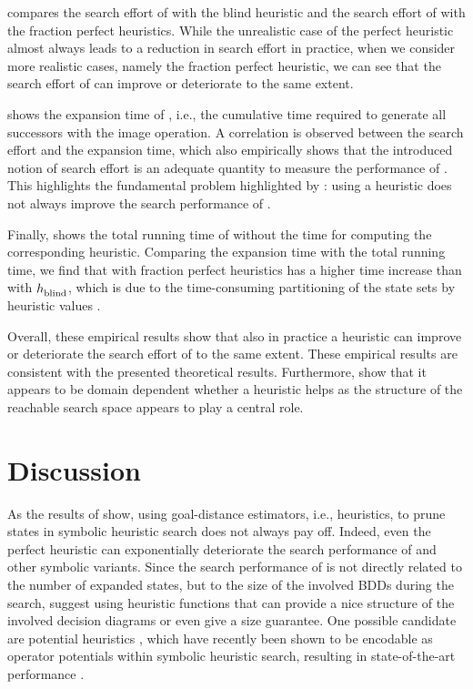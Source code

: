  compares the search effort of \bddastar{} with the blind heuristic and the search effort of \bddastar{} with the fraction perfect heuristics.
While the unrealistic case of the perfect heuristic almost always leads to a reduction in search effort in practice, when we consider more realistic cases, namely the fraction perfect heuristic, we can see that the search effort of \bddastar{} can improve or deteriorate to the same extent.

 shows the expansion time of \bddastar{}, i.e., the cumulative time required to generate all successors with the image operation.
A correlation is observed between the search effort and the expansion time, which also empirically shows that the introduced notion of search effort is an adequate quantity to measure the performance of \bddastar{}.
This highlights the fundamental problem highlighted by \textcite{speck-et-al-icaps2020}: using a heuristic does not always improve the search performance of \bddastar{}.

Finally,  shows the total running time of \bddastar{} without the time for computing the corresponding heuristic.
Comparing the expansion time with the total running time, we find that \bddastar{} with fraction perfect heuristics has a higher time increase than \bddastar{} with $h_\text{\scriptsize{blind}}^\text{\scriptsize{}}$, which is due to the time-consuming partitioning of the state sets by heuristic values \autocite{jensen-et-al-aij2008}.

Overall, these empirical results show that also in practice a heuristic can improve or deteriorate the search effort of \bddastar{} to the same extent.
These empirical results are consistent with the presented theoretical results.
Furthermore, \textcite{speck-et-al-icaps2020} show that it appears to be domain
dependent whether a heuristic helps \bddastar{} as the structure of the reachable search space appears to play a central role.

\section{Discussion}\label{sec:symbolic_search_discussion}
As the results of \textcite{speck-et-al-icaps2020} show, using goal-distance estimators, i.e., heuristics, to prune states in symbolic heuristic search does not always pay off.
Indeed, even the perfect heuristic can exponentially deteriorate the search performance of \bddastar{} and other symbolic \astar{} variants.
Since the search performance of \bddastar{} is not directly related to the number of expanded states, but to the size of the involved BDDs during the search, \textcite{speck-et-al-icaps2020} suggest using heuristic functions that can provide a nice structure of the involved decision diagrams or even give a size guarantee.
One possible candidate are potential heuristics \autocite{pommerening-et-al-aaai2015}, which have recently been shown to be encodable as operator potentials within symbolic heuristic search, resulting in state-of-the-art performance \autocite{fiser-et-al-icaps2021wshsdip}.

